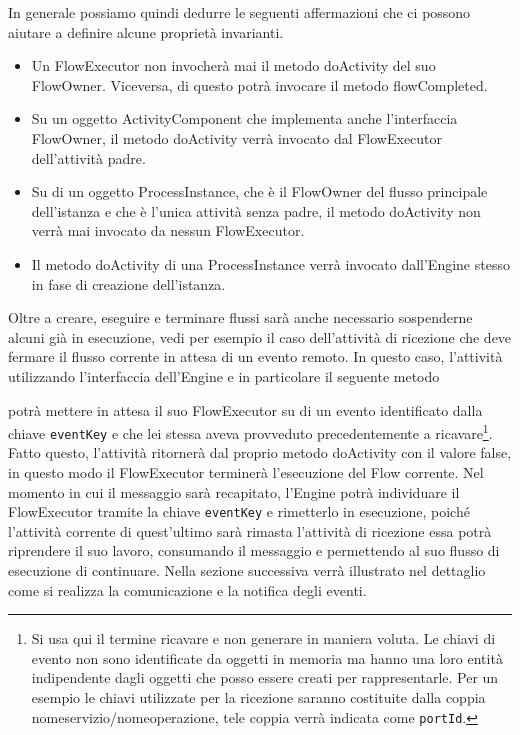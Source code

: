 In generale possiamo quindi dedurre le seguenti affermazioni che ci possono
aiutare a definire alcune proprietà invarianti.

\begin{itemize}
  \item Un FlowExecutor non invocherà mai il metodo doActivity del suo
  FlowOwner. Viceversa, di questo potrà invocare il metodo
  flowCompleted.
  
  \item Su un oggetto ActivityComponent che implementa anche l'interfaccia
  FlowOwner, il metodo doActivity verrà invocato dal FlowExecutor dell'attività 
  padre.
  
  \item Su di un oggetto ProcessInstance, che \`e il FlowOwner del flusso
  principale dell'istanza e che \`e l'unica attività senza padre, 
  il metodo doActivity non verrà mai invocato da nessun FlowExecutor.
  
  \item Il metodo doActivity di una ProcessInstance verrà invocato
  dall'Engine stesso in fase di creazione dell'istanza.
  
\end{itemize}

Oltre a creare, eseguire e terminare flussi sarà anche necessario sospenderne
alcuni già in esecuzione, vedi per esempio il caso dell'attività di ricezione
che deve fermare il flusso corrente in attesa di un evento remoto. In questo
caso, l'attività utilizzando l'interfaccia dell'Engine e in particolare il
seguente metodo



potrà mettere in attesa il suo FlowExecutor su di un evento identificato dalla
chiave \texttt{eventKey} e che lei stessa aveva provveduto
precedentemente a ricavare\footnote{Si usa qui il termine ricavare e non generare in maniera
  voluta. Le chiavi di evento non sono identificate da oggetti in memoria ma
  hanno una loro entità indipendente
  dagli oggetti che posso essere creati per rappresentarle. Per un esempio le
  chiavi utilizzate per la ricezione saranno costituite dalla coppia
  nomeservizio/nomeoperazione, tele coppia verrà indicata come
  \texttt{portId}.}. Fatto questo, l'attività ritornerà dal proprio
metodo doActivity con il valore false, in questo modo il FlowExecutor terminerà
l'esecuzione del Flow corrente. Nel momento in cui il messaggio sarà recapitato,
l'Engine potrà individuare il FlowExecutor tramite la chiave \texttt{eventKey} e
rimetterlo in esecuzione, poiché l'attività corrente di quest'ultimo sarà rimasta
l'attività di ricezione essa potrà riprendere il suo lavoro, consumando il
messaggio e permettendo al suo flusso di esecuzione di continuare. Nella sezione
successiva verrà illustrato nel dettaglio come si realizza la comunicazione e la
notifica degli eventi.

